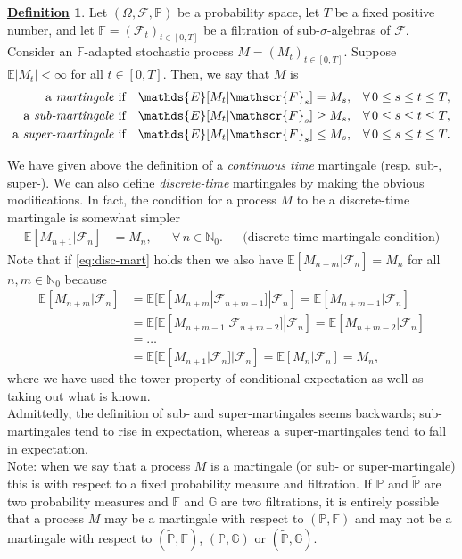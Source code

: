 \documentclass[12pt]{book}
\numberwithin{equation}{chapter}
\theoremstyle{plain}
\numberwithin{theorem}{section}
\theoremstyle{definition}
\newtheorem{definition}[theorem]{\underline{Definition}}
\numberwithin{exercise}{chapter}
\newcommand{\<}{\langle}
\renewcommand{\>}{\rangle}
\renewcommand{\(}{\left(}
\renewcommand{\)}{\right)}
\renewcommand{\[}{\left[}
\renewcommand{\]}{\right]}
\newcommand\Eb{\mathds{E}}
\newcommand\Fb{\mathds{F}}
\newcommand\Gb{\mathds{G}}
\newcommand\Pb{\mathds{P}}
\newcommand\Nb{\mathds{N}}
\newcommand\Fc{\mathscr{F}}
\newcommand\Om{\Omega}
\newcommand\sig{\sigma}
\newcommand\Pbt{\widetilde{\Pb}}
\begin{document}
\begin{definition}
\label{def:martingale}
 Let $(\Om, \Fc, \Pb)$ be a probability space, let $T$ be a fixed positive
number, and let $\Fb=(\Fc_t)_{t \in [0,T]}$ be a filtration of sub-$\sig$-algebras of $\Fc$.
Consider an $\Fb$-adapted stochastic process $M=(M_t)_{t \in [0,T]}$.  
Suppose $\Eb |M_t| < \infty$ for all $t \in [0,T]$.  Then, we say that $M$ is
\begin{align}
\text{a \emph{martingale} if}&&
\Eb[ M_t | \Fc_s ]
	&=	 M_s , &
	&		\forall \, 0 \leq s \leq t \leq T , \\
\text{a \emph{sub-martingale} if}&&
\Eb[ M_t | \Fc_s ]
	&\geq	M_s , &
	&		\forall \, 0 \leq s \leq t \leq T , \\
\text{a \emph{super-martingale} if}&&
\Eb[ M_t | \Fc_s ]
	&\leq	M_s , &
	&		\forall \, 0 \leq s \leq t \leq T . 
\end{align}
\end{definition}

\noindent
We have given above the definition of a \emph{continuous time} martingale (resp. sub-, super-).  We can also define \emph{discrete-time} martingales by making the obvious modifications.  In fact, the condition for a process $M$ to be a discrete-time martingale is somewhat simpler
\begin{align}
\Eb[ M_{n+1} | \Fc_n ]
	&=	 M_n , &
	&		\forall \, n \in \Nb_0 . &
	&		\text{(discrete-time martingale condition)} \label{eq:disc-mart}
\end{align}
Note that if \eqref{eq:disc-mart} holds then we also have $\Eb[ M_{n+m} | \Fc_n ] = M_n$ for all $n,m \in \Nb_0$ because
\begin{align}
\Eb[M_{n+m}|\Fc_n]
	&=	\Eb[ \Eb[ M_{n+m}|\Fc_{n+m-1}]|\Fc_n]
	=		\Eb[M_{n+m-1}|\Fc_n] \\
	&=	\Eb[ \Eb[ M_{n+m-1}|\Fc_{n+m-2}]|\Fc_n]
	=		\Eb[M_{n+m-2}|\Fc_n] \\
	&=	\ldots \\
	&=	\Eb[ \Eb[ M_{n+1}|\Fc_{n}]|\Fc_n]
	=		\Eb[M_{n}|\Fc_n]
	=		M_n ,
\end{align}
where we have used the tower property of conditional expectation as well as taking out what is known.
\\[0.5em]
Admittedly, the definition of sub- and super-martingales seems backwards; sub-martingales tend to rise in expectation, whereas a super-martingales tend to fall in expectation.
\\[0.5em]
Note: when we say that a process $M$ is a martingale (or sub- or super-martingale) this is with respect to a fixed probability measure and filtration.  If $\Pb$ and $\Pbt$ are two probability measures and $\Fb$ and $\Gb$ are two filtrations, it is entirely possible that a process $M$ may be a martingale with respect to $(\Pb,\Fb)$ and may not be a martingale with respect to $(\Pbt,\Fb)$, $(\Pb,\Gb)$ or $(\Pbt,\Gb)$.
\end{document}
